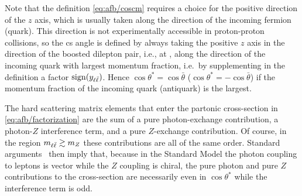 Note that the definition \cref{eq:afb/coscm} requires a choice for the positive
direction of the $z$ axis, which is usually taken along the direction of the
incoming fermion (quark).
%
This direction is  not experimentally accessible in proton-proton collisions,
so the \acrlong{cs} angle is defined by always taking the positive $z$ axis in
the direction of the boosted dilepton pair, i.e., at \lo, along the direction of
the incoming quark with largest momentum fraction, i.e.\ by supplementing in
the definition a factor $\operatorname{sign}(y_{\ell\bar{\ell}})$.
%
Hence $\cos\theta^*=\cos{\bar\theta}$ ($\cos\theta^*=-\cos{\bar\theta}$)  if
the momentum fraction of the incoming quark (antiquark) is the largest.

%
The hard scattering matrix elements that enter the partonic cross-section
in \cref{eq:afb/factorization} are the sum of a pure photon-exchange
contribution, a photon-$Z$ interference term, and a pure $Z$-exchange
contribution.
%
Of course, in the region
$m_{\ell\bar{\ell}} \gtrsim m_Z$ these contributions are all of the same order.
%
Standard arguments~\cite{Peskin:1995ev} then imply that, because in the
Standard Model the photon
coupling to leptons is vector  while the $Z$ coupling is chiral,
the pure photon and pure $Z$ contributions to the cross-section are
necessarily  even in $\cos\theta^*$ while the interference term is
odd.

